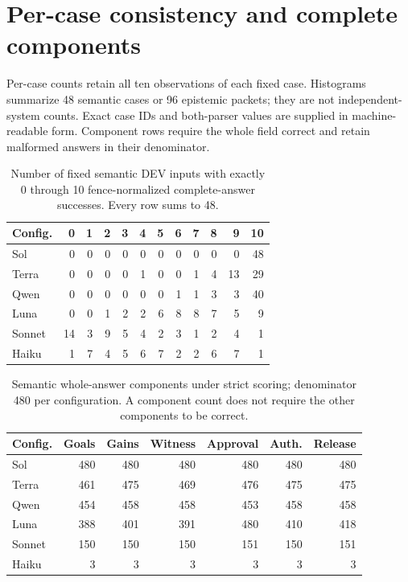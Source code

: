 \documentclass[a4paper,preprint,12pt,numbers,nopreprintline]{elsarticle}
\begin{document}

\section{Per-case consistency and complete components}\label{app:components}
Per-case counts retain all ten observations of each fixed case. Histograms summarize 48 semantic cases or 96 epistemic packets; they are not independent-system counts. Exact case IDs and both-parser values are supplied in machine-readable form. Component rows require the whole field correct and retain malformed answers in their denominator.
\begin{table}[htbp]\centering\scriptsize
\caption{Number of fixed semantic DEV inputs with exactly 0 through 10 fence-normalized complete-answer successes. Every row sums to 48.}\label{tab:consistency-semantic}
\setlength{\tabcolsep}{3pt}
\begin{tabular}{lrrrrrrrrrrr}\toprule
Config. & 0 & 1 & 2 & 3 & 4 & 5 & 6 & 7 & 8 & 9 & 10\\\midrule
Sol & 0 & 0 & 0 & 0 & 0 & 0 & 0 & 0 & 0 & 0 & 48\\
Terra & 0 & 0 & 0 & 0 & 1 & 0 & 0 & 1 & 4 & 13 & 29\\
Qwen & 0 & 0 & 0 & 0 & 0 & 0 & 1 & 1 & 3 & 3 & 40\\
Luna & 0 & 0 & 1 & 2 & 2 & 6 & 8 & 8 & 7 & 5 & 9\\
Sonnet & 14 & 3 & 9 & 5 & 4 & 2 & 3 & 1 & 2 & 4 & 1\\
Haiku & 1 & 7 & 4 & 5 & 6 & 7 & 2 & 2 & 6 & 7 & 1\\
\bottomrule\end{tabular}
\end{table}
\begin{table}[htbp]\centering\scriptsize
\caption{Semantic whole-answer components under strict scoring; denominator 480 per configuration. A component count does not require the other components to be correct.}\label{tab:components-semantic-primary}
\setlength{\tabcolsep}{3pt}
\begin{tabular}{lrrrrrr}\toprule
Config. & Goals & Gains & Witness & Approval & Auth. & Release\\\midrule
Sol & 480 & 480 & 480 & 480 & 480 & 480\\
Terra & 461 & 475 & 469 & 476 & 475 & 475\\
Qwen & 454 & 458 & 458 & 453 & 458 & 458\\
Luna & 388 & 401 & 391 & 480 & 410 & 418\\
Sonnet & 150 & 150 & 150 & 151 & 150 & 151\\
Haiku & 3 & 3 & 3 & 3 & 3 & 3\\
\bottomrule\end{tabular}
\end{table}
\end{document}

